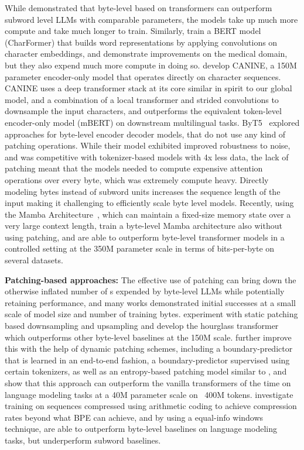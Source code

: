 \documentclass[]{fairmeta}
\begin{document}
While \cite{Choe2019BridgingTG} demonstrated that byte-level \llms{} based on transformers can outperform subword level LLMs with comparable parameters, the models take up much more compute and take much longer to train. Similarly, \cite{el2020characterbert} train a BERT model (CharFormer) that builds word representations by applying convolutions on character embeddings, and demonstrate improvements on the medical domain, but they also expend much more compute in doing so. \cite{clark2022canine} develop CANINE, a 150M parameter encoder-only model that operates directly on character sequences. CANINE uses a deep transformer stack at its core similar in spirit to our global model, and a combination of a local transformer and strided convolutions to downsample the input characters, and outperforms the equivalent token-level encoder-only model (mBERT) on downstream multilingual tasks. ByT5~\citep{xue2022byt5} explored approaches for byte-level encoder decoder models, that do not use any kind of patching operations. While their model exhibited improved robustness to noise, and was competitive with tokenizer-based models with 4x less data, the lack of patching meant that the models needed to compute expensive attention operations over every byte, which was extremely compute heavy. Directly modeling bytes instead of subword units increases the sequence length of the input making it challenging to efficiently scale byte level models. Recently, using the Mamba Architecture~\citep{gu2023mamba},  which can maintain a fixed-size memory state over a very large context length, \cite{wang2024mambabyte} train a byte-level Mamba architecture also without using patching, and are able to outperform byte-level transformer models in a \flop{} controlled setting at the 350M parameter scale in terms of bits-per-byte on several datasets.  

\textbf{Patching-based approaches:} The effective use of patching can bring down the otherwise inflated number of \flop{}s expended by byte-level LLMs while potentially retaining performance, and many works demonstrated initial successes at a small scale of model size and number of training bytes. \cite{nawrot-etal-2022-hierarchical} experiment with static patching based downsampling and upsampling and develop the hourglass transformer which outperforms other byte-level baselines at the 150M scale. \cite{nawrot-etal-2023-efficient} further improve this with the help of dynamic patching schemes, including a boundary-predictor that is learned in an end-to-end fashion, a boundary-predictor supervised using certain tokenizers, as well as an entropy-based patching model similar to \model{}, and show that this approach can outperform the vanilla transformers of the time on language modeling tasks at a 40M parameter scale on ~400M tokens. \cite{lester2024training} investigate training on sequences compressed using arithmetic coding to achieve compression rates beyond what BPE can achieve, and by using a equal-info windows technique, are able to outperform byte-level baselines on language modeling tasks, but underperform subword baselines.
\end{document}

